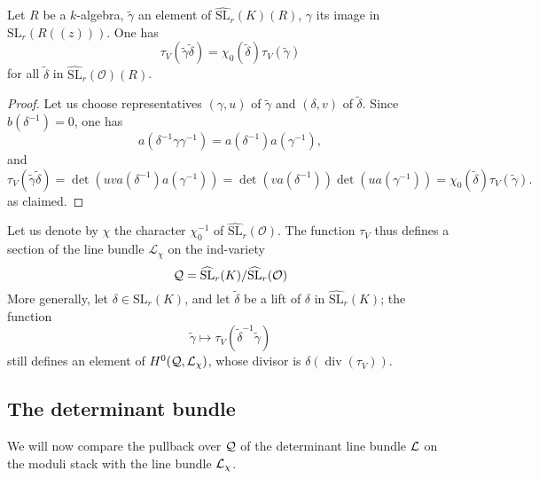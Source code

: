 \documentclass[12pt]{article}
\begin{document}
\begin{proposition}
    Let $R$ be a $k$-algebra, $\tilde{\gamma}$ an element of $\widehat{\mathrm{SL}}_r(K)(R)$, $\gamma$ its image in $\mathrm{SL}_r(R((z)))$. One has
    \[
        \tau_V(\tilde{\gamma} \tilde{\delta}) = \chi_0(\tilde{\delta}) \tau_V(\tilde{\gamma})
    \]
    for all $\tilde{\delta}$ in $\widehat{\mathrm{SL}}_r(\mathcal{O})(R)$.
\end{proposition}


\begin{proof}
    Let us choose representatives \( (\gamma, u) \) of \( \tilde{\gamma} \) and \( (\delta, v) \) of \( \tilde{\delta} \). Since \( b(\delta^{-1}) = 0 \), one has
    \[
        a(\delta^{-1} \gamma \gamma^{-1}) = a(\delta^{-1}) a(\gamma^{-1}),
    \]
    and
    \[
        \tau_V(\tilde{\gamma} \tilde{\delta}) = \det (u v a(\delta^{-1}) a(\gamma^{-1})) = \det(v a(\delta^{-1})) \det(ua(\gamma^{-1})) = \chi_0(\tilde{\delta}) \tau_V(\tilde{\gamma}).
    \]
    as claimed.
\end{proof}

Let us denote by \( \chi \) the character \( \chi_0^{-1} \) of \( \widehat{\mathrm{SL}}_r(\mathcal{O}) \). The function \( \tau_V \) thus defines a section of the line bundle \( \mathcal{L}_{\chi} \) on the ind-variety
\[
    {\mathcal{Q}} = \widehat{\mathrm{SL}}_r(K) / \widehat{\mathrm{SL}}_r(\mathcal{O})
\]
More generally, let \( \delta \in \mathrm{SL}_r(K) \), and let \( \tilde{\delta} \) be a lift of \( \delta \) in \( \widehat{\mathrm{SL}}_r(K) \); the function
\[
    \tilde{\gamma} \mapsto \tau_V(\tilde{\delta}^{-1} \tilde{\gamma})
\]
still defines an element of \( H^0({\mathcal{Q}}, \mathcal{L}_{\chi}) \), whose divisor is \( \delta(\operatorname{div}(\tau_V)) \).

\subsection{The determinant bundle}
We will now compare the pullback over ${\mathcal{Q}}$ of the determinant line bundle ${\mathcal{L}}$ on the moduli stack with the line bundle ${\mathcal{L}}_\chi$.
\end{document}
